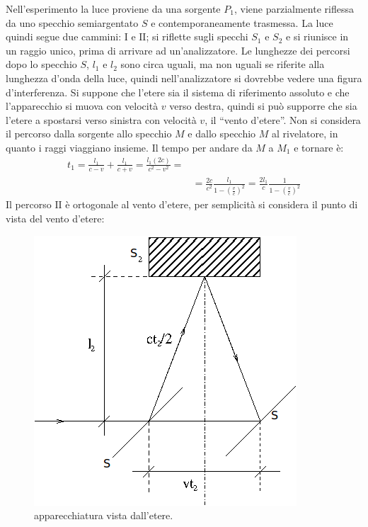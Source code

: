 Nell'esperimento la luce proviene da una sorgente $P_1$, viene parzialmente riflessa da uno specchio 
semiargentato $S$ e contemporaneamente trasmessa. La luce quindi segue due cammini: $\text{I}$ e $\text{II}$; 
si riflette sugli specchi $S_1$ e $S_2$ e si riunisce in un raggio unico, prima di arrivare ad un'analizzatore. 
Le lunghezze dei percorsi dopo lo specchio $S$, $l_1$ e $l_2$ sono circa uguali, ma non uguali se riferite alla 
lunghezza d'onda della luce, quindi nell'analizzatore si dovrebbe vedere una figura d'interferenza. 
Si suppone che l'etere sia il sistema di riferimento assoluto e che l'apparecchio si muova con velocità $v$ 
verso destra, quindi si può supporre che sia l'etere a spostarsi verso sinistra con velocità $v$, il ``vento d'etere''. 
Non si considera il percorso dalla sorgente allo specchio $M$ e dallo specchio $M$ al rivelatore, in quanto i raggi viaggiano insieme. 
Il tempo per andare da $M$ a $M_1$ e tornare è:
\begin{equation}
\begin{split}
 t_1 = \frac{l_1}{c-v}+\frac{l_1}{c+v}=\frac{l_1(2c)}{c^2-v^2} = \\
    &= \frac{2c}{c^2}\frac{l_1}{1-\left(\frac{v}{c}\right)^2} = \frac{2l_1}{c}\frac{1}{1-\left(\frac{v}{c}\right)^2}
\end{split}
\end{equation}
Il percorso $\text{II}$ è ortogonale al vento d'etere, per semplicità si considera il punto di vista del vento d'etere:
\begin{figure}[htbp]
\centering
\includegraphics[scale=0.8]{immagini/michelson/Morley}
\caption{apparecchiatura vista dall'etere.}
\end{figure}

